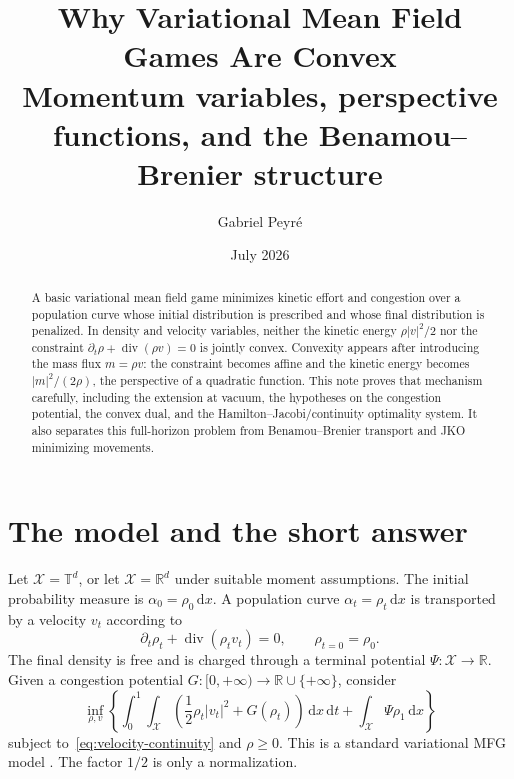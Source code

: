 \documentclass[11pt,a4paper]{article}
\title{Why Variational Mean Field Games Are Convex\\
  \large Momentum variables, perspective functions, and the Benamou--Brenier structure}
\author{Gabriel Peyr\'e}
\date{July 2026}
\theoremstyle{definition}
\newcommand{\RR}{\mathbb R}
\newcommand{\diverg}{\operatorname{div}}
\newcommand{\dd}{\,\mathrm d}
\newcommand{\al}{\alpha}
\newcommand{\abs}[1]{\left\lvert#1\right\rvert}
\begin{document}
\maketitle

\begin{abstract}
A basic variational mean field game minimizes kinetic effort and congestion
over a population curve whose initial distribution is prescribed and whose
final distribution is penalized. In density and velocity variables, neither
the kinetic energy \(\rho|v|^2/2\) nor the constraint
\(\partial_t\rho+\operatorname{div}(\rho v)=0\) is jointly convex. Convexity
appears after introducing the mass flux \(m=\rho v\): the constraint becomes
affine and the kinetic energy becomes \(|m|^2/(2\rho)\), the perspective of a
quadratic function. This note proves that mechanism carefully, including the
extension at vacuum, the hypotheses on the congestion potential, the convex
dual, and the Hamilton--Jacobi/continuity optimality system. It also separates
this full-horizon problem from Benamou--Brenier transport and JKO minimizing
movements.
\end{abstract}

\tableofcontents

\section{The model and the short answer}

Let \(\mathcal X=\mathbb T^d\), or let \(\mathcal X=\RR^d\) under suitable
moment assumptions. The initial probability measure is
\(\al_0=\rho_0\dd x\). A population curve
\(\al_t=\rho_t\dd x\) is transported by a velocity \(v_t\) according to
\begin{equation}\label{eq:velocity-continuity}
  \partial_t\rho_t+\diverg(\rho_tv_t)=0,
  \qquad \rho_{t=0}=\rho_0.
\end{equation}
The final density is free and is charged through a terminal potential
\(\Psi:\mathcal X\to\RR\). Given a congestion potential
\(G:[0,+\infty)\to\RR\cup\{+\infty\}\), consider
\begin{equation}\label{eq:velocity-primal}
  \inf_{\rho,v}
  \left\{
    \int_0^1\!\int_{\mathcal X}
      \left(\frac12\rho_t\abs{v_t}^2+G(\rho_t)\right)\dd x\dd t
    +\int_{\mathcal X}\Psi\rho_1\dd x
  \right\}
\end{equation}
subject to~\eqref{eq:velocity-continuity} and \(\rho\geq0\). This is a
standard variational MFG model
\citep{BenamouCarlier2015,BenamouCarlierSantambrogio2017}. The factor \(1/2\)
is only a normalization.
\end{document}
